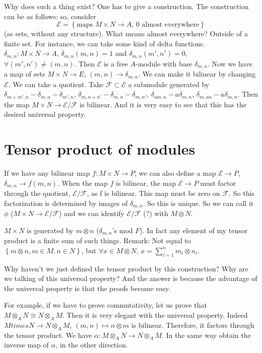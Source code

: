 Why does such a thing exist? One has to give a construction. The construction can be as follows: so, consider 
\[
\mathcal{E}=\left\{\text{maps }M\times N \to A\text{, 0 almost everywhere}\right\}
\]
(as sets, without any structure). What means almost everywhere? Outside of a finite set.  For instance, we can take some kind of delta functions. $\delta_{m,n}:M\times N\to A$, $\delta_{m,n}(m,n)=1$ and $\delta_{m,n}(m',n')=0$, $\forall (m',n')\neq(m,n)$. Then $\mathcal{E}$ is a free $A$-module with base $\delta_{m,n}$. Now we have a map of sets $M \times N \to E$, $(m,n)\to \delta_{m,n}$. We can make it bilinear by changing $\mathcal{E}$. We can take a quotient. Take $\mathcal{F}\subset \mathcal{E}$ a submodule generated by $\delta_{m+m',n}-\delta_{m,n}-\delta_{m',n}$, $\delta_{m,n+n'}-\delta_{m,n}-\delta_{m,n'}$,  $\delta_{am,n}-a\delta_{m,n}$, $\delta_{m,an}-a\delta_{m,n}$. Then the map $M \times N \to \mathcal{E}/\mathcal{F}$ is bilinear. And it is very easy to see that this has the desired universal property.

\section{Tensor product of modules}

If we have any bilinear map $f:M \times N \to P$, we can also define a map $\mathcal{E} \to P$, $\delta_{m,n} \to f(m,n)$. When the map $f$ is bilinear, the map $\mathcal{E}\to P$ must factor through the quotient, $\mathcal{E}/\mathcal{F}$, as f is bilinear. This map must be zero on $\mathcal{F}$.  So this factorization is determined by images of $\delta_{m,n}$. So this is unique. So we can call it $\phi$ ($M\times N\to \mathcal{E}/\mathcal{F}$) and we can identify $\mathcal{E}/\mathcal{F}$ (?) with $M \otimes N$. 

$M\times N$ is generated by $m\otimes n$ ($\delta_{m,n}$'s mod $F$). In fact any element of my tensor product is a finite sum of such things. Remark: Not equal to $\left\{ m\otimes n, m\in M, n \in N\right\}$, but $\forall x\in M\otimes N$, $x=\sum_{i=1}^n m_i\otimes n_i$.

Why haven't we just defined the tensor product by this construction? Why are we talking of this universal property? And the answer is because the advantage of the universal property is that the proofs become easy. 

For example, if we have to prove commutativity, let us prove that $M \otimes_A N\cong N \otimes_A M$. Then it is very elegant with the universal property. Indeed $M times N \to N  \otimes_A M$, $(m, n) \mapsto n \otimes m$ is bilinear. Therefore, it factors through the tensor product. We have $\alpha:M \otimes_A N \to N \otimes_A M$. In the same way obtain the inverse map of $\alpha$, in the other direction. 

